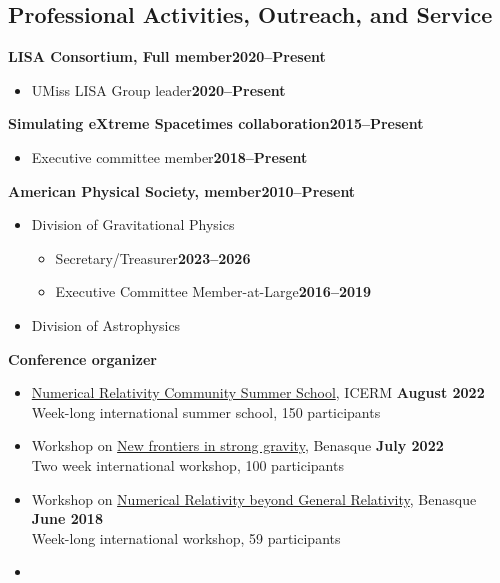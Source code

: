 \documentclass[margin,line]{res}
\begin{document}
\begin{resume}
\section{\sc Professional Activities, Outreach, and Service}
{\bf LISA Consortium, Full member}\hfill{\bf 2020--Present}
\begin{itemize}
\item[] UMiss LISA Group leader\hfill{\bf 2020--Present}
\end{itemize}
{\bf Simulating eXtreme Spacetimes collaboration}\hfill{\bf 2015--Present}
\begin{itemize}
\item[] Executive committee member\hfill{\bf 2018--Present}
\end{itemize}
{\bf American Physical Society, member}\hfill{\bf 2010--Present}
\begin{itemize}
\item[] Division of Gravitational Physics
  \begin{itemize}
  \item[] Secretary/Treasurer\hfill{\bf 2023--2026}
  \item[] Executive Committee Member-at-Large\hfill{\bf 2016--2019}
  \end{itemize}
\item[] Division of Astrophysics
\end{itemize}
{\bf Conference organizer}
\vspace*{.05in}
\begin{itemize}
\item[]
  \href{https://icerm.brown.edu/events/re-22-f20w1/}
  {Numerical Relativity Community Summer School},
  ICERM \hfill {\bf August 2022} \\
\hspace*{1em} Week-long international summer school, 150 participants
\item[] Workshop on
  \href{https://www.benasque.org/2022relativity/}{New frontiers in
    strong gravity},
  Benasque \hfill {\bf July 2022} \\
\hspace*{1em} Two week international workshop, 100 participants
\item[] Workshop on
  \href{http://www.benasque.org/2018relativity/}{Numerical Relativity
    beyond General Relativity},
  Benasque \hfill {\bf June 2018} \\
\hspace*{1em} Week-long international workshop, 59 participants
\item[]

\end{itemize}
\end{resume}
\end{document}
